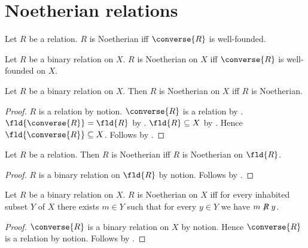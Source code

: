 \section{Noetherian relations}




\begin{definition}\label{noetherian}
    Let $R$ be a relation.
    $R$ is Noetherian iff $\converse{R}$ is well-founded.
\end{definition}

\begin{definition}\label{noetherian_on}
    Let $R$ be a binary relation on $X$.
    $R$ is Noetherian on $X$ iff
        $\converse{R}$ is well-founded on $X$.
\end{definition}

\begin{proposition}\label{noetherian_on_iff_noetherian}
    Let $R$ be a binary relation on $X$.
    Then $R$ is Noetherian on $X$ iff $R$ is Noetherian.
\end{proposition}
\begin{proof}
    $R$ is a relation by notion.
    $\converse{R}$ is a relation by .
    $\fld{\converse{R}}=\fld{R}$ by .
    $\fld{R}\subseteq X$ by .
    Hence $\fld{\converse{R}}\subseteq X$.
    Follows by
        .
\end{proof}

\begin{proposition}\label{noetherian_iff_noetherian_on_field}
    Let $R$ be a relation.
    Then $R$ is Noetherian iff $R$ is Noetherian on $\fld{R}$.
\end{proposition}
\begin{proof}
    $R$ is a binary relation on $\fld{R}$ by notion.
    Follows by .
\end{proof}

\begin{proposition}\label{noetherian_on_sink_characterization}
    Let $R$ be a binary relation on $X$.
    $R$ is Noetherian on $X$ iff
        for every inhabited subset $Y$ of $X$ there exists $m\in Y$
            such that for every $y\in Y$ we have
                $m\not\mathrel{R}y$.
\end{proposition}
\begin{proof}
    $\converse{R}$ is a binary relation on $X$ by notion.
    Hence $\converse{R}$ is a relation by notion.
    Follows by .
\end{proof}


